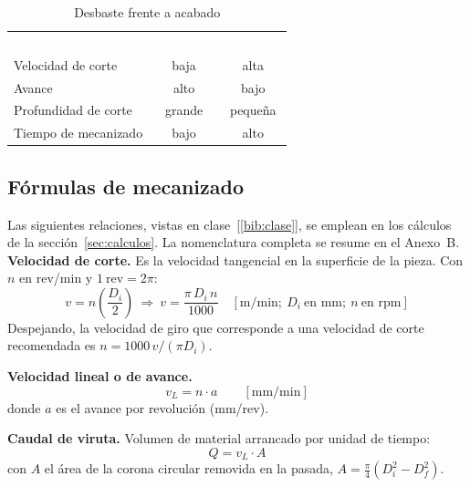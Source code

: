 \documentclass[12pt,a4paper]{article}
\newcommand{\encab}[1]{\textcolor{white}{\sffamily\bfseries #1}}
\newcommand{\refbib}[1]{[\ref{#1}]}
\begin{document}
\begin{table}[!htb]
	\centering
	\caption{Desbaste frente a acabado}\label{tab:desbaste}
	\small
	\begin{tabular}{l c c}
		\rowcolor{darkblue}
		\encab{Parámetro}    & \encab{Desbaste} & \encab{Acabado} \\
		Velocidad de corte   & baja             & alta            \\
		Avance               & alto             & bajo            \\
		Profundidad de corte & grande           & pequeña         \\
		Tiempo de mecanizado & bajo             & alto            \\
	\end{tabular}
\end{table}

\subsection{Fórmulas de mecanizado}

Las siguientes relaciones, vistas en clase~\refbib{bib:clase}, se emplean en los
cálculos de la sección~\ref{sec:calculos}. La nomenclatura completa se resume en
el Anexo~B.\\[-4pt]

\textbf{Velocidad de corte.} Es la velocidad tangencial en la superficie de la
pieza. Con $n$ en rev/min y $1\ \text{rev}=2\pi$:
\begin{equation}\label{eq:v}
	v = n\left(\frac{D_i}{2}\right)\ \Longrightarrow\ v=\frac{\pi\, D_i\, n}{1000}
	\quad[\text{m/min};\ D_i\ \text{en mm};\ n\ \text{en rpm}]
\end{equation}
Despejando, la velocidad de giro que corresponde a una velocidad de corte
recomendada es $n = 1000\,v/(\pi D_i)$.

\textbf{Velocidad lineal o de avance.}
\begin{equation}\label{eq:vl}
	v_L = n\cdot a \qquad [\text{mm/min}]
\end{equation}
donde $a$ es el avance por revolución (mm/rev).

\textbf{Caudal de viruta.} Volumen de material arrancado por unidad de tiempo:
\begin{equation}\label{eq:Q}
	Q = v_L\cdot A
\end{equation}
con $A$ el área de la corona circular removida en la pasada,
$A=\frac{\pi}{4}\left(D_i^2-D_f^2\right)$.
\end{document}
